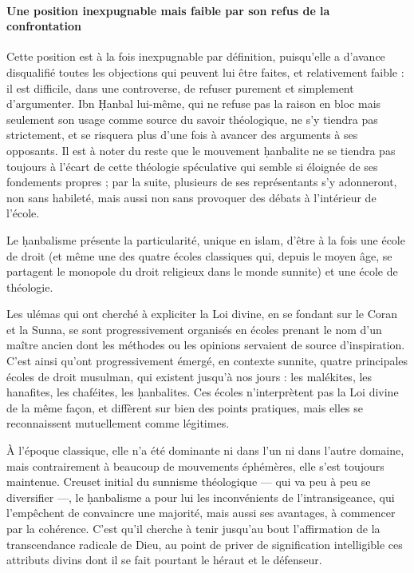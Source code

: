 
\paragraph{Une position inexpugnable mais faible par son refus de la confrontation} Cette position est à la fois inexpugnable par définition, puisqu'elle a
d'avance disqualifié toutes les objections qui peuvent lui être faites,
et relativement faible : il est difficile, dans une controverse, de
refuser purement et simplement d'argumenter. Ibn Ḥanbal lui-même, qui ne
refuse pas la raison en bloc mais seulement son usage comme source du
savoir théologique, ne s'y tiendra pas strictement, et se risquera plus
d'une fois à avancer des arguments à ses opposants. Il est à noter du
reste que le mouvement ḥanbalite ne se tiendra pas toujours à l'écart de
cette théologie spéculative qui semble si éloignée de ses fondements
propres ; par la suite, plusieurs de ses représentants s'y adonneront,
non sans habileté, mais aussi non sans provoquer des débats à
l'intérieur de l'école. 

Le ḥanbalisme présente la particularité, unique en islam, d'être à la
fois une école de droit (et même une des quatre écoles classiques qui,
depuis le moyen âge, se partagent le monopole du droit religieux dans le
monde sunnite) et une école de théologie. 
\begin{Def}
 Les ulémas qui ont cherché à expliciter la Loi divine, en se fondant sur le Coran et la Sunna, se sont progressivement organisés en écoles prenant le nom d’un maître ancien dont les méthodes ou les opinions servaient de source d’inspiration. C’est ainsi qu’ont progressivement émergé, en contexte sunnite, quatre principales écoles de droit musulman, qui existent jusqu’à nos jours : les malékites, les hanafites, les chaféites, les ḥanbalites. Ces écoles n’interprètent pas la Loi divine de la même façon, et diffèrent sur bien des points pratiques, mais elles se reconnaissent mutuellement comme légitimes. 
\end{Def}
À l'époque classique, elle n'a
été dominante ni dans l'un ni dans l'autre domaine, mais contrairement à
beaucoup de mouvements éphémères, elle s'est toujours maintenue. Creuset
initial du sunnisme théologique --- qui va peu à peu se diversifier ---,
le ḥanbalisme a pour lui les inconvénients de l'intransigeance, qui
l'empêchent de convaincre une majorité, mais aussi ses avantages, à
commencer par la cohérence. C'est qu'il cherche à tenir jusqu'au bout
l'affirmation de la transcendance radicale de Dieu, au point de priver
de signification intelligible ces attributs divins dont il se fait
pourtant le héraut et le défenseur.

